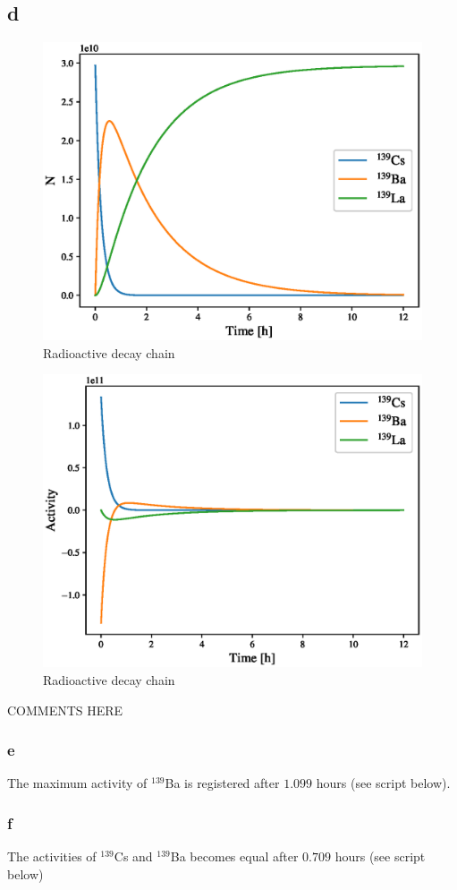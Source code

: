 \subsection*{d}
\begin{figure}[htbp]
    \centering
    \includegraphics[scale=0.8]{ex7/decay.eps}
    \caption{Radioactive decay chain}
    \label{fig:decay_chain}
\end{figure}

\begin{figure}[htbp]
    \centering
    \includegraphics[scale=0.8]{ex7/decay_activities.eps}
    \caption{Radioactive decay chain}
    \label{fig:decay_chain_activities}
\end{figure}

COMMENTS HERE

\subsubsection*{e}
The maximum activity of $^{139}$Ba is registered after $1.099$ hours (see script below).

\subsubsection*{f}
The activities of $^{139}$Cs and $^{139}$Ba becomes equal after $0.709$ hours (see script below)